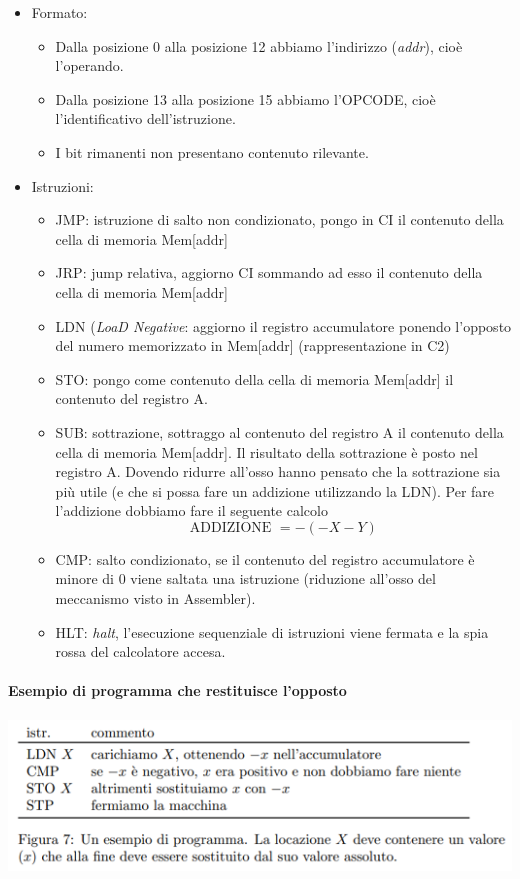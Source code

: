 \begin{itemize}
	\item Formato:
	\begin{itemize}
		\item Dalla posizione 0 alla posizione 12 abbiamo l'indirizzo (\emph{addr}), cioè l'operando.
		\item Dalla posizione 13 alla posizione 15 abbiamo l'OPCODE, cioè l'identificativo dell'istruzione.
		\item I bit rimanenti non presentano contenuto rilevante.
	\end{itemize}
	\item Istruzioni:
	\begin{itemize}
		\item JMP: istruzione di salto non condizionato, pongo in CI il contenuto della cella di memoria Mem[addr]
		\item JRP: jump relativa, aggiorno CI sommando ad esso il contenuto della cella di memoria Mem[addr]
		\item LDN (\emph{LoaD Negative}: aggiorno il registro accumulatore ponendo l'opposto del numero memorizzato in Mem[addr] (rappresentazione in C2)
		\item STO: pongo come contenuto della cella di memoria Mem[addr] il contenuto del registro A.
		\item SUB: sottrazione, sottraggo al contenuto del registro A il contenuto della cella di memoria Mem[addr]. Il risultato della sottrazione è posto nel registro A. Dovendo ridurre all'osso hanno pensato che la sottrazione sia più utile (e che si possa fare un addizione utilizzando la LDN). Per fare l'addizione dobbiamo fare il seguente calcolo
		\[\text{ADDIZIONE }=-(-X-Y)\]
		\item CMP: salto condizionato, se il contenuto del registro accumulatore è minore di 0 viene saltata una istruzione (riduzione all'osso del meccanismo visto in Assembler).
		\item HLT: \emph{halt}, l'esecuzione sequenziale di istruzioni viene fermata e la spia rossa del calcolatore accesa.
	\end{itemize}
\end{itemize}
\paragraph{Esempio di programma che restituisce l'opposto}
\begin{center}
	\includegraphics{img/2.PNG}
\end{center}
